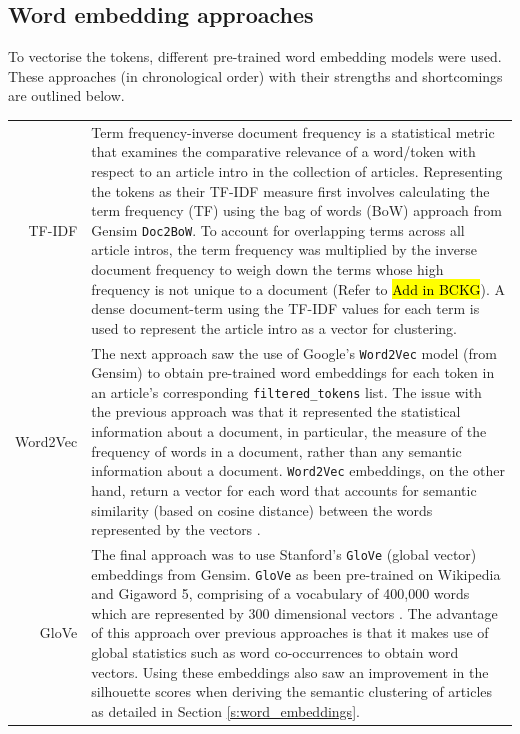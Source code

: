 \subsection{Word embedding approaches} \label{word_embed_approaches}
To vectorise the tokens, different pre-trained word embedding models were used. These approaches (in chronological order) with their strengths and shortcomings are outlined below.

\renewcommand\arraystretch{2}
\captionsetup{singlelinecheck=false, labelfont=sc, labelsep=quad}
\begin{longtable}{@{\,}r <{\hskip 2pt} !{\foo} >{\arraybackslash}p{13cm}}
\centering

TF-IDF & Term frequency-inverse document frequency is a statistical metric that examines the comparative relevance of a word/token with respect to an article intro in the collection of articles. Representing the tokens as their TF-IDF measure first involves calculating the term frequency (TF) using the bag of words (BoW) approach from Gensim \texttt{Doc2BoW}. To account for overlapping terms across all article intros, the term frequency was multiplied by the inverse document frequency to weigh down the terms whose high frequency is not unique to a document (Refer to  \hl{Add in BCKG}). A dense document-term using the TF-IDF values for each term is used to represent the article intro as a vector for clustering. \\

Word2Vec & The next approach saw the use of Google's \texttt{Word2Vec} model (from Gensim) to obtain pre-trained word embeddings for each token in an article's corresponding \texttt{filtered\_tokens} list. The issue with the previous approach was that it represented the statistical information about a document, in particular, the measure of the frequency of words in a document, rather than any semantic information about a document. \texttt{Word2Vec} embeddings, on the other hand, return a vector for each word that accounts for semantic similarity (based on cosine distance) between the words represented by the vectors \cite{word2vec}.   \\

GloVe & The final approach was to use Stanford’s \texttt{GloVe} (global vector) embeddings from Gensim. \texttt{GloVe} as been pre-trained on Wikipedia and Gigaword 5, comprising of a vocabulary of 400,000 words which are represented by 300 dimensional vectors \cite{glove}. The advantage of this approach over previous approaches is that it makes use of global statistics such as word co-occurrences to obtain word vectors. Using these embeddings also saw an improvement in the silhouette scores when deriving the semantic clustering of articles as detailed in Section \ref{s:word_embeddings}. \\
\end{longtable}

